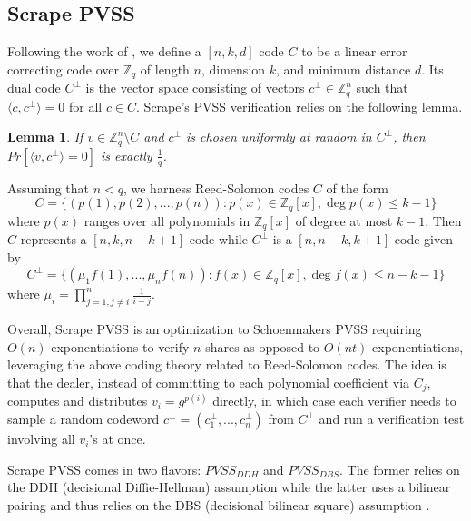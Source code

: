 \documentclass[letterpaper,twocolumn,10pt]{article}
\newtheorem{lemma}[theorem]{Lemma}
\theoremstyle{definition}
\theoremstyle{remark}
\begin{document}
\subsection{Scrape PVSS}
\label{appendix:scrapePVSS}
Following the work of \cite{cascudo2017scrape}, we define a $[n, k, d]$ code $C$ to be a linear error correcting code over $\mathbb{Z}_q$ of length $n$, dimension $k$, and minimum distance $d$. Its dual code $C^\perp$ is the vector space consisting of vectors $c^\perp \in \mathbb{Z}_q^n$ such that $\langle c, c^\perp \rangle = 0$ for all $c \in C$. Scrape's PVSS verification relies on the following lemma.
\begin{lemma}
If $v \in \mathbb{Z}_q^n \setminus C$ and $c^\perp$ is chosen uniformly at random in $C^\perp$, then $Pr\left[\langle v, c^\perp \rangle = 0\right]$ is exactly $\frac{1}{q}$.
\end{lemma}

Assuming that $n < q$, we harness Reed-Solomon codes $C$ of the form
\[
C = \{(p(1), p(2), ..., p(n)) : p(x) \in \mathbb{Z}_q[x], \deg p(x) \leq k - 1\}
\]
where $p(x)$ ranges over all polynomials in $\mathbb{Z}_q[x]$ of degree at most $k - 1$. Then $C$ represents a $[n, k, n - k + 1]$ code while $C^\perp$ is a $[n, n - k, k + 1]$ code given by
\[
C^\perp = \{(\mu_1 f(1), ..., \mu_n f(n)) : f(x) \in \mathbb{Z}_q[x], \deg f(x) \leq n - k - 1\}
\]
where $\mu_i = \prod_{j = 1, j \neq i}^n \frac{1}{i - j}$.

Overall, Scrape PVSS is an optimization to Schoenmakers PVSS requiring $O(n)$ exponentiations to verify $n$ shares as opposed to $O(n t)$ exponentiations, leveraging the above coding theory related to Reed-Solomon codes. The idea is that the dealer, instead of committing to each polynomial coefficient via $C_j$, computes and distributes $v_i = g^{p(i)}$ directly, in which case each verifier needs to sample a random codeword $c^\perp = (c_1^\perp, ..., c_n^\perp)$ from $C^\perp$ and run a verification test involving all $v_i$'s at once.

Scrape PVSS comes in two flavors: $PVSS_{DDH}$ and $PVSS_{DBS}$. The former relies on the DDH (decisional Diffie-Hellman) assumption while the latter uses a bilinear pairing and thus relies on the DBS (decisional bilinear square) assumption \cite{heidarvand2008public}.\\
\end{document}
